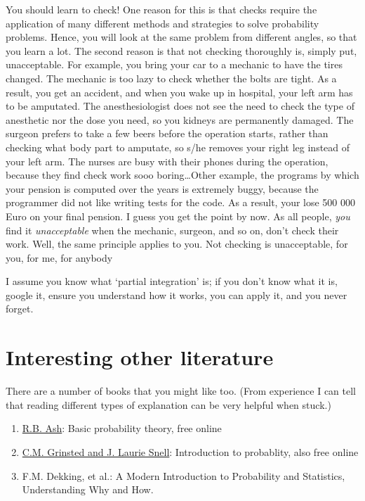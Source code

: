 \documentclass[a4paper]{article}
\theoremstyle{definition}
\newcommand{\1}[1]{\,I_{#1}} %
\begin{document}
You should learn to check!
One reason for this is that checks require the application of many different methods and strategies to solve probability problems.
Hence, you will look at the same problem from different angles, so that you learn a lot.
The second reason is that not checking thoroughly is, simply put, unacceptable. 
For example, you bring your car to a mechanic to have the tires changed.
The mechanic is too lazy to check whether the bolts are tight.
As a result, you get an accident, and when you wake up in hospital, your left arm has to be amputated.
The anesthesiologist does not see the need to check the type of anesthetic nor the dose you need, so you kidneys are permanently damaged.
The surgeon prefers to take a few beers before the operation starts, rather than checking what body part to amputate, so s/he removes your right leg instead of your left arm.
The nurses are busy with their phones during the operation, because they find check work sooo boring\ldots Other example, the programs by which your pension is computed over the years is extremely buggy, because the programmer did not like writing tests for the code.
As a result, your lose 500 000 Euro on your final pension.
I guess you get the point by now.
As all people, \emph{you} find it \emph{unacceptable} when the mechanic, surgeon, and so on, don't check their work.
Well, the same principle applies to you.
Not checking is unacceptable, for you, for me, for anybody


I assume you know what  `partial integration' is;  if you don't know what it is, google it,  ensure you understand how it works, you can apply it, and you never forget. 



\section{Interesting other literature}
\label{sec:org4c58a40}

There are a number of books that you might like too. (From experience I can tell that reading different types of explanation can be very helpful when stuck.)
\begin{enumerate}
\item \href{https://faculty.math.illinois.edu/\~r-ash/BPT.html}{R.B. Ash}: Basic probability theory, free online
\item \href{https://math.dartmouth.edu/\~prob/prob/prob.pdf}{C.M. Grinsted and J. Laurie Snell}: Introduction to probablity, also free online
\item F.M. Dekking, et al.: A Modern Introduction to Probability and Statistics, Understanding Why and How.
\end{enumerate}
\end{document}
